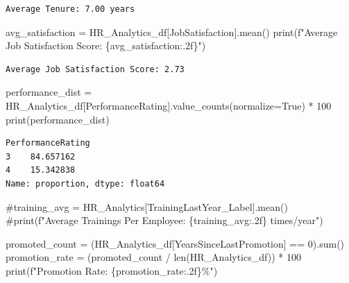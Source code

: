 \documentclass[
  letterpaper,
  DIV=11,
  numbers=noendperiod]{scrartcl}
\newenvironment{Shaded}{\begin{snugshade}}{\end{snugshade}}
\newcommand{\BuiltInTok}[1]{\textcolor[rgb]{0.00,0.23,0.31}{#1}}
\newcommand{\CommentTok}[1]{\textcolor[rgb]{0.37,0.37,0.37}{#1}}
\newcommand{\DecValTok}[1]{\textcolor[rgb]{0.68,0.00,0.00}{#1}}
\newcommand{\NormalTok}[1]{\textcolor[rgb]{0.00,0.23,0.31}{#1}}
\newcommand{\OperatorTok}[1]{\textcolor[rgb]{0.37,0.37,0.37}{#1}}
\newcommand{\SpecialCharTok}[1]{\textcolor[rgb]{0.37,0.37,0.37}{#1}}
\newcommand{\SpecialStringTok}[1]{\textcolor[rgb]{0.13,0.47,0.30}{#1}}
\newcommand{\StringTok}[1]{\textcolor[rgb]{0.13,0.47,0.30}{#1}}
\newcommand{\VariableTok}[1]{\textcolor[rgb]{0.07,0.07,0.07}{#1}}
\begin{document}
\begin{verbatim}
Average Tenure: 7.00 years
\end{verbatim}

\begin{Shaded}
\begin{Highlighting}[]
\NormalTok{avg\_satisfaction }\OperatorTok{=}\NormalTok{ HR\_Analytics\_df[}\StringTok{\textquotesingle{}JobSatisfaction\textquotesingle{}}\NormalTok{].mean()}
\BuiltInTok{print}\NormalTok{(}\SpecialStringTok{f"Average Job Satisfaction Score: }\SpecialCharTok{\{}\NormalTok{avg\_satisfaction}\SpecialCharTok{:.2f\}}\SpecialStringTok{"}\NormalTok{)}
\end{Highlighting}
\end{Shaded}

\begin{verbatim}
Average Job Satisfaction Score: 2.73
\end{verbatim}

\begin{Shaded}
\begin{Highlighting}[]
\NormalTok{performance\_dist }\OperatorTok{=}\NormalTok{ HR\_Analytics\_df[}\StringTok{\textquotesingle{}PerformanceRating\textquotesingle{}}\NormalTok{].value\_counts(normalize}\OperatorTok{=}\VariableTok{True}\NormalTok{) }\OperatorTok{*} \DecValTok{100}
\BuiltInTok{print}\NormalTok{(performance\_dist)}
\end{Highlighting}
\end{Shaded}

\begin{verbatim}
PerformanceRating
3    84.657162
4    15.342838
Name: proportion, dtype: float64
\end{verbatim}

\begin{Shaded}
\begin{Highlighting}[]
\CommentTok{\#training\_avg = HR\_Analytics[\textquotesingle{}TrainingLastYear\_Label\textquotesingle{}].mean()}
\CommentTok{\#print(f"Average Trainings Per Employee: \{training\_avg:.2f\} times/year")}
\end{Highlighting}
\end{Shaded}

\begin{Shaded}
\begin{Highlighting}[]
\NormalTok{promoted\_count }\OperatorTok{=}\NormalTok{ (HR\_Analytics\_df[}\StringTok{\textquotesingle{}YearsSinceLastPromotion\textquotesingle{}}\NormalTok{] }\OperatorTok{==} \DecValTok{0}\NormalTok{).}\BuiltInTok{sum}\NormalTok{()}
\NormalTok{promotion\_rate }\OperatorTok{=}\NormalTok{ (promoted\_count }\OperatorTok{/} \BuiltInTok{len}\NormalTok{(HR\_Analytics\_df)) }\OperatorTok{*} \DecValTok{100}
\BuiltInTok{print}\NormalTok{(}\SpecialStringTok{f"Promotion Rate: }\SpecialCharTok{\{}\NormalTok{promotion\_rate}\SpecialCharTok{:.2f\}}\SpecialStringTok{\%"}\NormalTok{)}
\end{Highlighting}
\end{Shaded}
\end{document}
